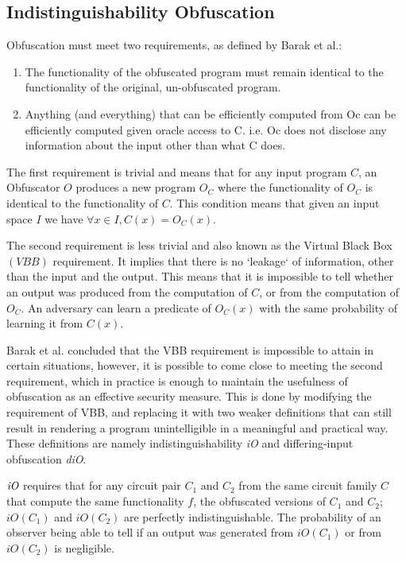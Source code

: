 \subsection{Indistinguishability Obfuscation}
Obfuscation must meet two requirements, as defined by Barak et al.\cite{barak}:
\begin{enumerate}
	\item The functionality of the obfuscated program must remain identical to the
	functionality of the original, un-obfuscated program.
	\item Anything (and everything) that can be efficiently computed from Oc can be
	efficiently computed given oracle access to C. i.e. Oc does not disclose any
	information about the input other than what C does.
\end{enumerate}
The first requirement is trivial and means that for any input program $C$, an
Obfuscator $O$ produces a new program $O_C$ where the functionality of $O_C$
is identical to the functionality of $C$. This condition means that given an input
space $I$ we have $ \forall x \in I, C(x) = O_C(x)$.
\par
The second requirement is less trivial and also known as the Virtual Black Box
$(VBB)$ requirement. It implies that there is no `leakage` of information,
other than the input and the output. This means that it is impossible to tell
whether an output was produced from the computation of $C$, or from the computation
of $O_C$. An adversary can learn a predicate of $O_C(x)$ with the same probability
of learning it from $C(x)$.
\par
Barak et al. concluded that the VBB requirement is impossible to attain in certain
situations\cite{barak}, however, it is possible to come close to meeting the second
requirement, which in practice is enough to maintain the usefulness of obfuscation
as an effective security measure. This is done by modifying the requirement of VBB,
and replacing it with two weaker definitions that can still result in rendering a
program unintelligible in a meaningful and practical way. These definitions are
namely indistinguishability \emph{iO} and differing-input obfuscation \emph{diO}.
\par
$\emph{iO}$ requires that for any circuit pair $C_1$ and $C_2$ from the same circuit
family $C$ that compute the same functionality $f$, the obfuscated versions of
$C_1$ and $C_2$; $iO(C_1)$ and $iO(C_2)$ are perfectly indistinguishable. The
probability of an observer being able to tell if an output was generated from
$iO(C_1)$ or from $iO(C_2)$ is negligible.
